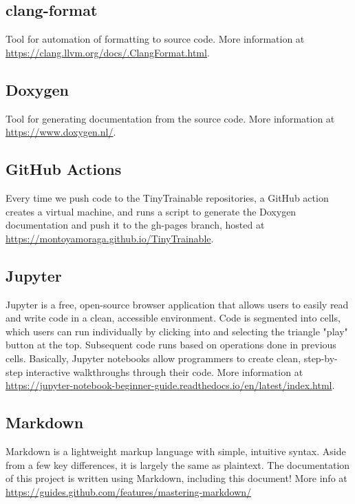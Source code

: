 \subsection{clang-format}

Tool for automation of formatting to source code. More information at \url{https://clang.llvm.org/docs/.ClangFormat.html}.

\subsection{Doxygen}

Tool for generating documentation from the source code. More information at \url{https://www.doxygen.nl/}.

\subsection{GitHub Actions}

Every time we push code to the TinyTrainable repositories, a GitHub action creates a virtual machine, and runs a script to generate the Doxygen documentation and push it to the gh-pages branch, hosted at \url{https://montoyamoraga.github.io/TinyTrainable}.

\subsection{Jupyter}

Jupyter is a free, open-source browser application that allows users to easily read and write code in a clean, accessible environment. Code is segmented into cells, which users can run individually by clicking into and selecting the triangle "play" button at the top. Subsequent code runs based on operations done in previous cells. Basically, Jupyter notebooks allow programmers to create clean, step-by-step interactive walkthroughs through their code. More information at \url{https://jupyter-notebook-beginner-guide.readthedocs.io/en/latest/index.html}.
\subsection{Markdown}

Markdown is a lightweight markup language with simple, intuitive syntax. Aside from a few key differences, it is largely the same as plaintext. The documentation of this project is written using Markdown, including this document! More info at \url{https://guides.github.com/features/mastering-markdown/}

